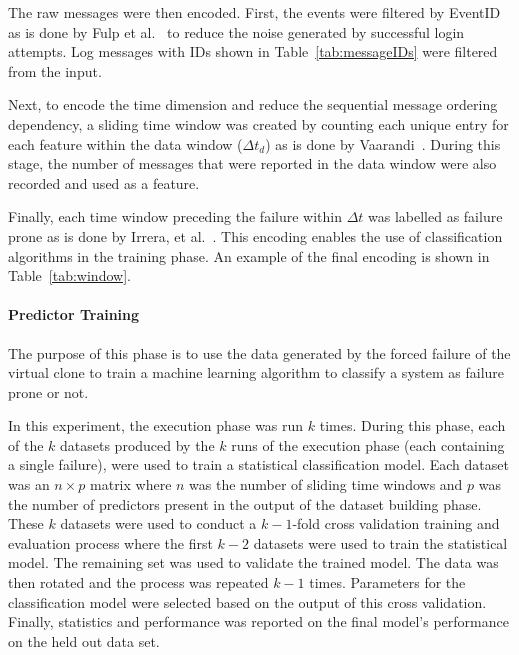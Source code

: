 \tabMessage

The raw messages were then encoded.  First, the events were filtered by EventID
as is done by Fulp et al.~\cite{fulp2008} to reduce the noise generated by
successful login attempts.  Log messages with IDs shown in
Table~\ref{tab:messageIDs} were filtered from the input.  

Next, to encode the time dimension and reduce the sequential message ordering
dependency, a sliding time window was created by counting each unique entry for
each feature within the data window ($\Delta t_d$) as is done by
Vaarandi~\cite{vaarandi2002}.  During this stage, the number of messages that
were reported in the data window were also recorded and used as a feature.

Finally, each time window preceding the failure within $\Delta t$ was labelled
as failure prone as is done by Irrera, et al.~\cite{irrera2015}.  This encoding
enables the use of classification algorithms in the training phase.  An example
of the final encoding is shown in Table~\ref{tab:window}.

\tabMessageIDs %
\tabSlidingWindow

\paragraph{Predictor Training} \label{sec:predictor.training}
The purpose of this phase is to use the data generated by the forced failure of
the virtual clone to train a machine learning algorithm to classify a system as
failure prone or not.  

In this experiment, the execution phase was run $k$ times.  During this phase,
each of the $k$ datasets produced by the $k$ runs of the execution phase (each
containing a single failure), were used to train a statistical classification
model.  Each dataset was an $n \times p$ matrix where $n$ was the number of
sliding time windows and $p$ was the number of predictors present in the output
of the dataset building phase.  These $k$ datasets were used to conduct a $k -
1$-fold cross validation training and evaluation process where the first $k -
2$ datasets were used to train the statistical model.  The remaining set was
used to validate the trained model.  The data was then rotated and the process
was repeated $k - 1$ times.  Parameters for the classification model were
selected based on the output of this cross validation.  Finally, statistics and
performance was reported on the final model's performance on the held out data
set.

